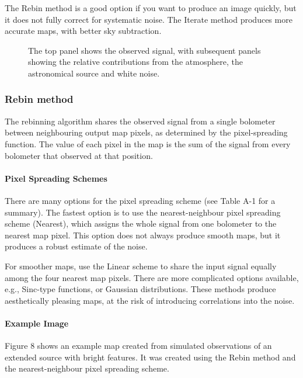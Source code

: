 \documentclass[twoside,11pt]{article}
\renewcommand{\_}{\texttt{\symbol{95}}}
\begin{document}
The Rebin method is a good option if you want to produce an image
quickly, but it does not fully correct for systematic noise. The
Iterate method produces more accurate maps, with better sky
subtraction.

\begin{figure}
\caption{The top panel shows the observed signal, with subsequent
  panels showing the relative contributions from the atmosphere, the
  astronomical source and white noise.}
\end{figure}

\subsubsection{Rebin method}

The rebinning algorithm shares the observed signal from a single
bolometer between neighbouring output map pixels, as determined by the
pixel-spreading function. The value of each pixel in the map is the
sum of the signal from every bolometer that observed at that position.

\paragraph{Pixel Spreading Schemes}

There are many options for the pixel spreading scheme (see Table A-1
for a summary). The fastest option is to use the nearest-neighbour
pixel spreading scheme (Nearest), which assigns the whole signal from
one bolometer to the nearest map pixel. This option does not always
produce smooth maps, but it produces a robust estimate of the noise.

For smoother maps, use the Linear scheme to share the input signal
equally among the four nearest map pixels. There are more complicated
options available, e.g., Sinc-type functions, or Gaussian
distributions. These methods produce aesthetically pleasing maps, at
the risk of introducing correlations into the noise.

\paragraph{Example Image}

Figure 8 shows an example map created from simulated observations of
an extended source with bright features. It was created using the
Rebin method and the nearest-neighbour pixel spreading scheme.
\end{document}
